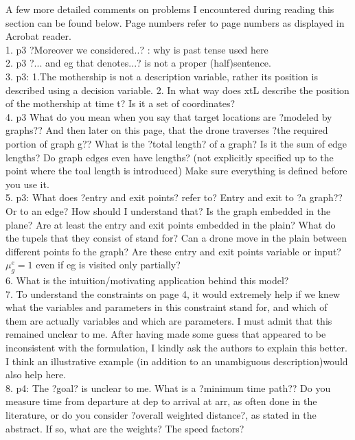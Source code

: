 \documentclass{article}
\newenvironment{reviewer}{\setcounter{pointcounter}{1}}{}
\begin{document}
\begin{reviewer}
\begin{itshape}
A few more detailed comments on problems I encountered during reading this section can be found below.
Page numbers refer to page numbers as displayed in Acrobat reader.\\
1. p3 ?Moreover we considered..? : why is past tense used here\\
2. p3 ?... and eg that denotes...? is not a proper (half)sentence.\\
3. p3: 1.The mothership is not a description variable, rather its position is described using a decision variable. 2. In what way does xtL describe the position of the mothership at time t? Is it a set of coordinates?\\
4. p3 What do you mean when you say that target locations are ?modeled by graphs?? And then later on this page, that the drone traverses ?the required portion of graph g?? What is the ?total length? of a graph? Is it the sum of edge lengths? Do graph edges even have lengths? (not explicitly specified up to the point where the toal length is introduced) Make sure everything is defined before you use it.\\
5. p3: What does ?entry and exit points? refer to? Entry and exit to ?a graph?? Or to an edge? How should I understand that? Is the graph embedded in the plane? Are at least the entry and exit points embedded in the plain? What do the tupels that they consist of stand for? Can a drone move in the plain between different points fo the graph? Are these entry and exit points variable or input? $\mu^e_g = 1$ even if eg is visited only partially?\\
6. What is the intuition/motivating application behind this model?\\
7. To understand the constraints on page 4, it would extremely help if we knew what the variables and parameters in this constraint stand for, and which of them are actually variables and which are parameters. I must admit that this remained unclear to me. After having made some guess that appeared to be inconsistent with the formulation, I kindly ask the authors to explain this better. I think an illustrative example (in addition to an unambiguous description)would also help here.\\
8. p4: The ?goal? is unclear to me. What is a ?minimum time path?? Do you measure time from departure at dep to arrival at arr, as often done in the literature, or do you consider ?overall weighted distance?, as stated in the abstract. If so, what are the weights? The speed factors?\\
\end{itshape}


\end{reviewer}
\end{document}
